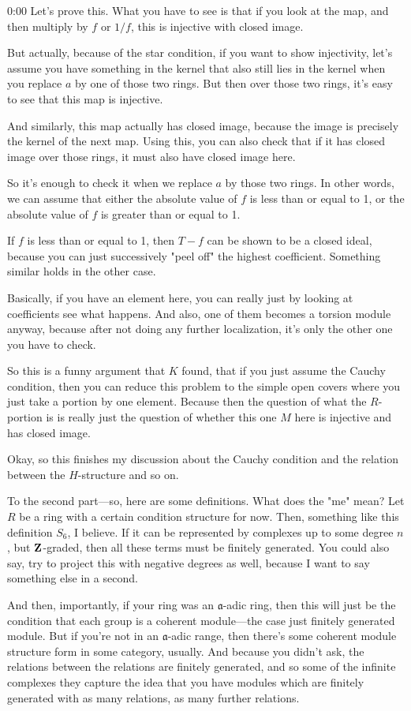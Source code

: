 \begin{unfinished}{0:00}
Let's prove this. What you have to see is that if you look at the map, and then multiply by $f$ or $1/f$, this is injective with closed image.

But actually, because of the star condition, if you want to show injectivity, let's assume you have something in the kernel that also still lies in the kernel when you replace $a$ by one of those two rings. But then over those two rings, it's easy to see that this map is injective.

And similarly, this map actually has closed image, because the image is precisely the kernel of the next map. Using this, you can also check that if it has closed image over those rings, it must also have closed image here.

So it's enough to check it when we replace $a$ by those two rings. In other words, we can assume that either the absolute value of $f$ is less than or equal to 1, or the absolute value of $f$ is greater than or equal to 1.

If $f$ is less than or equal to 1, then $T - f$ can be shown to be a closed ideal, because you can just successively "peel off" the highest coefficient. Something similar holds in the other case.

Basically, if you have an element here, you can really just by looking at coefficients see what happens. And also, one of them becomes a torsion module anyway, because after not doing any further localization, it's only the other one you have to check.

So this is a funny argument that $K$ found, that if you just assume the Cauchy condition, then you can reduce this problem to the simple open covers where you just take a portion by one element. Because then the question of what the $R$-portion is is really just the question of whether this one $M$ here is injective and has closed image.

Okay, so this finishes my discussion about the Cauchy condition and the relation between the $H$-structure and so on.

To the second part---so, here are some definitions. What does the "me" mean? Let $R$ be a ring with a certain condition structure for now. Then, something like this definition $S_6$, I believe. If it can be represented by complexes up to some degree $n$, but $\mathbf Z$-graded, then all these terms must be finitely generated. You could also say, try to project this with negative degrees as well, because I want to say something else in a second.

And then, importantly, if your ring was an $\mathfrak{a}$-adic ring, then this will just be the condition that each group is a coherent module---the case just finitely generated module. But if you're not in an $\mathfrak{a}$-adic range, then there's some coherent module structure form in some category, usually. And because you didn't ask, the relations between the relations are finitely generated, and so some of the infinite complexes they capture the idea that you have modules which are finitely generated with as many relations, as many further relations.


\end{unfinished}
